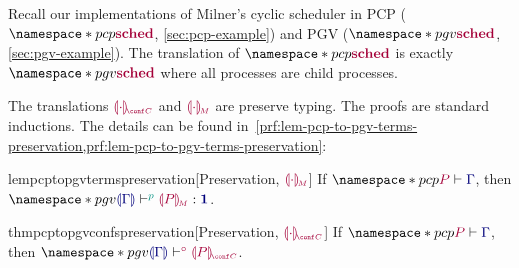 \documentclass[main.tex]{subfiles}
\begin{document}
Recall our implementations of Milner's cyclic scheduler in PCP ($\pcp{\tm{\sched}}$, \cref{sec:pcp-example}) and PGV ($\pgv{\tm{\sched}}$, \cref{sec:pgv-example}). The translation of $\pcp{\tm{\sched}}$ is exactly $\pgv{\tm{\sched}}$ where all processes are child processes.

The translations $\tm{\cpgvC{\cdot}}$ and $\tm{\cpgvM{\cdot}}$ are preserve typing. The proofs are standard inductions. The details can be found in~\cref{prf:lem-pcp-to-pgv-terms-preservation,prf:lem-pcp-to-pgv-terms-preservation}:
\begin{compacttheorems}
  \begin{restatablelemma}{lempcptopgvtermspreservation}[Preservation, ${\tm{\cpgvM{\cdot}}}$]
    \label{lem:pcp-to-pgv-terms-preservation}
    If $\pcp{\seq{P}{\ty{\Gamma}}}$, then $\pgv{\tseq[\cs{p}]{\ty{\cpgvT{\Gamma}}}{\cpgvM{P}}{\tyunit}}$.
  \end{restatablelemma}
  \begin{restatabletheorem}{thmpcptopgvconfspreservation}[Preservation, ${\tm{\cpgvC{\cdot}}}$]
    \label{thm:pcp-to-pgv-confs-preservation}
    If $\pcp{\seq{P}{\ty{\Gamma}}}$, then $\pgv{\cseq[\child]{\ty{\cpgvT{\Gamma}}}{\cpgvC{P}}}$.
  \end{restatabletheorem}
\end{compacttheorems}
\end{document}
